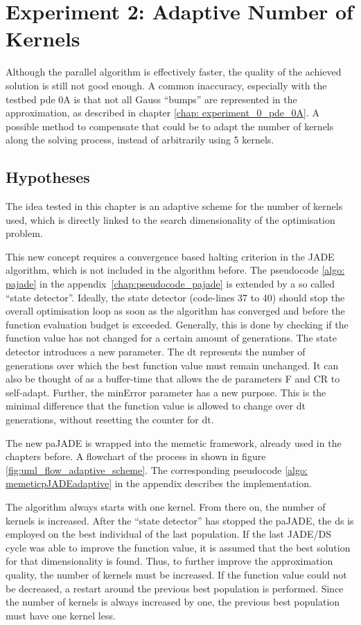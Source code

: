\documentclass[./\jobname.tex]{subfiles}
\begin{document}
\chapter {Experiment 2: Adaptive Number of Kernels}
\label{chap:experimet_2}

Although the parallel algorithm is effectively faster, the quality of the achieved solution is still not good enough. A common inaccuracy, especially with the testbed \gls{pde} 0A is that not all Gauss ``bumps'' are represented in the approximation, as described in chapter \ref{chap: experiment_0_pde_0A}. A possible method to compensate that could be to adapt the number of kernels along the solving process, instead of arbitrarily using 5 kernels. 

\section{Hypotheses}

The idea tested in this chapter is an adaptive scheme for the number of kernels used, which is directly linked to the search dimensionality of the optimisation problem. 

This new concept requires a convergence based halting criterion in the JADE algorithm, which is not included in the algorithm before. The pseudocode \ref{algo: pajade} in the \mbox{appendix \ref{chap:pseudocode_pajade}} is extended by a so called ``state detector''. Ideally, the state detector (code-lines 37 to 40) should stop the overall optimisation loop as soon as the algorithm has converged and before the function evaluation budget is exceeded. Generally, this is done by checking if the function value has not changed for a certain amount of generations. The state detector introduces a new parameter. The \gls{dt} represents the number of generations over which the best function value must remain unchanged. It can also be thought of as a buffer-time that allows the \gls{de} parameters F and CR to self-adapt. Further, the minError parameter has a new purpose. This is the minimal difference that the function value is allowed to change over \gls{dt} generations, without resetting the counter for \gls{dt}. 

The new paJADE is wrapped into the memetic framework, already used in the chapters before. A flowchart of the process in shown in figure \ref{fig:uml_flow_adaptive_scheme}. The corresponding pseudocode \ref{algo: memeticpJADEadaptive} in the appendix describes the implementation.

The algorithm always starts with one kernel. From there on, the number of kernels is increased. After the ``state detector'' has stopped the paJADE, the \gls{ds} is employed on the best individual of the last population. If the last JADE/DS cycle was able to improve the function value, it is assumed that the best solution for that dimensionality is found. Thus, to further improve the approximation quality, the number of kernels must be increased. If the function value could not be decreased, a restart around the previous best population is performed. Since the number of kernels is always increased by one, the previous best population must have one kernel less. 
\end{document}
